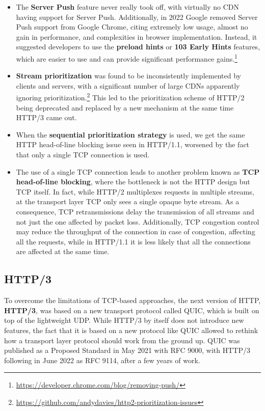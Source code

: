 \begin{itemize}
    \item The \textbf{Server Push} feature never really took off, with virtually no CDN having support for Server Push. Additionally, in 2022 Google removed Server Push support from Google Chrome, citing extremely low usage, almost no gain in performance, and complexities in browser implementation. Instead, it suggested developers to use the \textbf{preload hints} or \textbf{103 Early Hints} features, which are easier to use and can provide significant performance gains.\footnote{\url{https://developer.chrome.com/blog/removing-push/}}
    \item \textbf{Stream prioritization} was found to be inconsistently implemented by clients and servers, with a significant number of large CDNs apparently ignoring prioritization.\footnote{\url{https://github.com/andydavies/http2-prioritization-issues}} This led to the prioritization scheme of HTTP/2 being deprecated and replaced by a new mechanism at the same time HTTP/3 came out.
    \item When the \textbf{sequential prioritization strategy} is used, we get the same HTTP head-of-line blocking issue seen in HTTP/1.1, worsened by the fact that only a single TCP connection is used.
    \item The use of a single TCP connection leads to another problem known as \textbf{TCP head-of-line blocking}, where the bottleneck is not the HTTP design but TCP itself. In fact, while HTTP/2 multiplexes requests in multiple streams, at the transport layer TCP only sees a single opaque byte stream. As a consequence, TCP retransmissions delay the transmission of all streams and not just the one affected by packet loss. Additionally, TCP congestion control may reduce the throughput of the connection in case of congestion, affecting all the requests, while in HTTP/1.1 it is less likely that all the connections are affected at the same time.
\end{itemize}

\subsection{HTTP/3}
\label{sec:bg/http3}

To overcome the limitations of TCP-based approaches, the next version of HTTP, \textbf{HTTP/3}, was based on a new transport protocol called QUIC, which is built on top of the lightweight UDP. While HTTP/3 by itself does not introduce new features, the fact that it is based on a new protocol like QUIC allowed to rethink how a transport layer protocol should work from the ground up. QUIC was published as a Proposed Standard in May 2021 with RFC 9000, with HTTP/3 following in June 2022 as RFC 9114, after a few years of work.\cite{http3}

